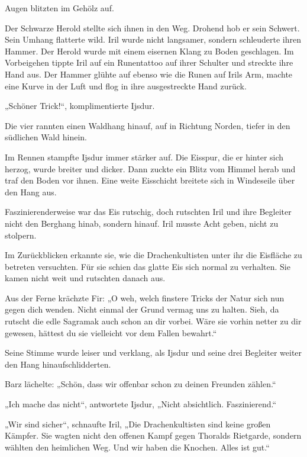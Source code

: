 Augen blitzten im Gehölz auf.

Der Schwarze Herold stellte sich ihnen in den Weg. Drohend hob er sein Schwert. Sein Umhang flatterte wild. Iril wurde nicht langsamer, sondern schleuderte ihren Hammer. Der Herold wurde mit einem eisernen Klang zu Boden geschlagen. Im Vorbeigehen tippte Iril auf ein Runentattoo auf ihrer Schulter und streckte ihre Hand aus. Der Hammer glühte auf ebenso wie die Runen auf Irils Arm, machte eine Kurve in der Luft und flog in ihre ausgestreckte Hand zurück.

„Schöner Trick!“, komplimentierte Ijsdur.

Die vier rannten einen Waldhang hinauf, auf in Richtung Norden, tiefer in den südlichen Wald hinein.

Im Rennen stampfte Ijsdur immer stärker auf. Die Eisspur, die er hinter sich herzog, wurde breiter und dicker. Dann zuckte ein Blitz vom Himmel herab und traf den Boden vor ihnen. Eine weite Eisschicht breitete sich in Windeseile über den Hang aus.

Faszinierenderweise war das Eis rutschig, doch rutschten Iril und ihre Begleiter nicht den Berghang hinab, sondern hinauf. Iril musste Acht geben, nicht zu stolpern.

Im Zurückblicken erkannte sie, wie die Drachenkultisten unter ihr die Eisfläche zu betreten versuchten. Für sie schien das glatte Eis sich normal zu verhalten. Sie kamen nicht weit und rutschten danach aus.

Aus der Ferne krächzte Fir: „O weh, welch finstere Tricks der Natur sich nun gegen dich wenden. Nicht einmal der Grund vermag uns zu halten. Sieh, da rutscht die edle Sagramak auch schon an dir vorbei. Wäre sie vorhin netter zu dir gewesen, hättest du sie vielleicht vor dem Fallen bewahrt.“

Seine Stimme wurde leiser und verklang, als Ijsdur und seine drei Begleiter weiter den Hang hinaufschlidderten.

Barz lächelte: „Schön, dass wir offenbar schon zu deinen Freunden zählen.“

„Ich mache das nicht“, antwortete Ijsdur, „Nicht absichtlich. Faszinierend.“

„Wir sind sicher“, schnaufte Iril, „Die Drachenkultisten sind keine großen Kämpfer. Sie wagten nicht den offenen Kampf gegen Thoralds Rietgarde, sondern wählten den heimlichen Weg. Und wir haben die Knochen. Alles ist gut.“



\trennzeichen



